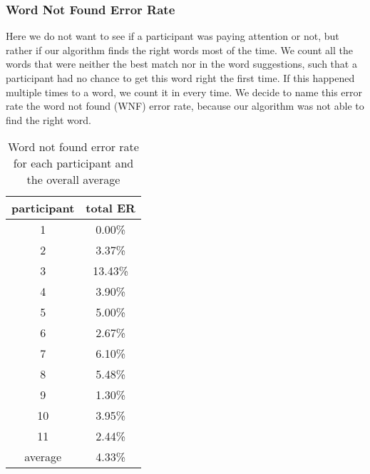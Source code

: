 \subsubsection{Word Not Found Error Rate}
Here we do not want to see if a participant was paying attention or not, but rather if our algorithm finds the right words most of the time. We count all the words that were neither the best match nor in the word suggestions, such that a participant had no chance to get this word right the first time. If this happened multiple times to a word, we count it in every time. We decide to name this error rate the word not found (WNF) error rate, because our algorithm was not able to find the right word.
\iffalse
\begin{figure}[H]
    \makebox[\textwidth][c]{
        \centering
        \subbottom[with characters\label{fig:error_system:error_system1}]{\texttt{[image: system\_error2\_1.png]}}\hspace{-3.0em}
        \subbottom[with words\label{fig:error_system:error_system2}]{\texttt{[image: system\_error2\_2.png]}}
    }
    \caption{percentage of characters/words that were not found by the system neither as best match nor as suggestion}
    \label{fig:error_system}
\end{figure}
\begin{figure}[H]
    \centering
    \texttt{[image: system\_error2\_2.pdf]}
    \caption{percentage of words that were not found by the system neither as best match nor as suggestion}
    \label{fig:error_system}
\end{figure}
\fi
\begin{table}[H]
    \centering
    \caption{Word not found error rate for each participant and the overall average}
    \begin{tabular}{cc} \toprule
        participant&total ER\\ \midrule
        1&0.00\%\\
        2&3.37\%\\
        3&13.43\%\\
        4&3.90\%\\
        5&5.00\%\\
        6&2.67\%\\
        7&6.10\%\\
        8&5.48\%\\
        9&1.30\%\\
        10&3.95\%\\
        11&2.44\%\\\bottomrule
        average&4.33\%\\
        \bottomrule
    \end{tabular}
    \label{tab:wnf_er}
\end{table}
